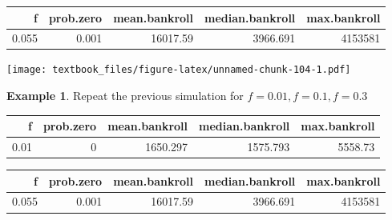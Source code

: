 \documentclass[
  11pt,
]{book}
\newenvironment{Shaded}{\begin{snugshade}}{\end{snugshade}}
\newcommand{\AttributeTok}[1]{\textcolor[rgb]{0.77,0.63,0.00}{#1}}
\newcommand{\DecValTok}[1]{\textcolor[rgb]{0.00,0.00,0.81}{#1}}
\newcommand{\FunctionTok}[1]{\textcolor[rgb]{0.00,0.00,0.00}{#1}}
\newcommand{\NormalTok}[1]{#1}
\newcommand{\SpecialCharTok}[1]{\textcolor[rgb]{0.00,0.00,0.00}{#1}}
\newcommand{\StringTok}[1]{\textcolor[rgb]{0.31,0.60,0.02}{#1}}
\theoremstyle{definition}
\theoremstyle{definition}
\newtheorem{example}{Example}[chapter]
\theoremstyle{definition}
\theoremstyle{definition}
\theoremstyle{remark}
\begin{document}
\begin{table}[H]
\centering
\begin{tabular}{rrrrr}
\toprule
f & prob.zero & mean.bankroll & median.bankroll & max.bankroll\\
\midrule
0.055 & 0.001 & 16017.59 & 3966.691 & 4153581\\
\bottomrule
\end{tabular}
\end{table}

\begin{Shaded}
\end{Shaded}

\texttt{[image: textbook\_files/figure-latex/unnamed-chunk-104-1.pdf]}

\newpage

\begin{example}
Repeat the previous simulation for \(f=0.01, f=0.1, f=0.3\)
\end{example}

\begin{table}[H]
\centering
\begin{tabular}{rrrrr}
\toprule
f & prob.zero & mean.bankroll & median.bankroll & max.bankroll\\
\midrule
0.01 & 0 & 1650.297 & 1575.793 & 5558.73\\
\bottomrule
\end{tabular}
\end{table}

\begin{table}[H]
\centering
\begin{tabular}{rrrrr}
\toprule
f & prob.zero & mean.bankroll & median.bankroll & max.bankroll\\
\midrule
0.055 & 0.001 & 16017.59 & 3966.691 & 4153581\\
\bottomrule
\end{tabular}
\end{table}
\end{document}
